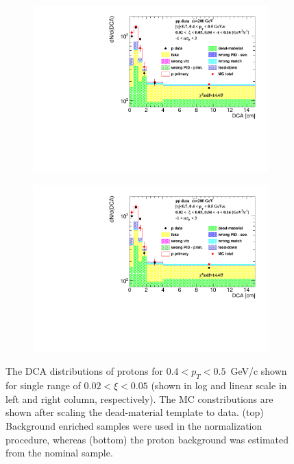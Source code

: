 \begin{figure}[b!]
\begin{subfigure}{.47\textwidth}
	\end{subfigure}
	\begin{subfigure}{.47\textwidth}
		\includegraphics[width=\linewidth, page=4]{chapters/chrgSTAR/img/DCAproton/background_p_0.pdf}
	\end{subfigure}
	\begin{subfigure}{.47\textwidth}
		\includegraphics[width=\linewidth, page=5]{chapters/chrgSTAR/img/DCAproton/background_p_0.pdf}
	\end{subfigure}
	\caption{The $\textrm{DCA}$ distributions of protons for $0.4<p_T<0.5$~GeV/c shown for single range of $0.02<\xi<0.05$ (shown in log and linear scale in left and right column, respectively). The MC  constributions are shown after scaling the dead-material template  to data. (top) Background enriched samples were used in the normalization procedure, whereas (bottom) the proton background was estimated from the nominal sample.}
	\label{fig:bkg_proton}
\end{figure}

